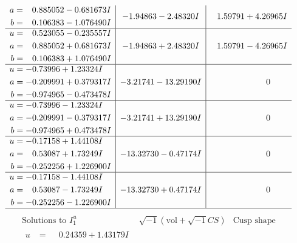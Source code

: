 \documentclass[1p]{elsarticle_modified}
\theoremstyle{definition}
\newcommand{\I}{\sqrt{-1}}
\begin{document}
$$\begin{array}{c|c|c}
\begin{aligned}
a &= \phantom{-}0.885052 - 0.681673 I \\
b &= \phantom{-}0.106383 - 1.076490 I\end{aligned}
 & -1.94863 - 2.48320 I & \phantom{-}1.59791 + 4.26965 I \\ \hline\begin{aligned}
u &= \phantom{-}0.523055 - 0.235557 I \\
a &= \phantom{-}0.885052 + 0.681673 I \\
b &= \phantom{-}0.106383 + 1.076490 I\end{aligned}
 & -1.94863 + 2.48320 I & \phantom{-}1.59791 - 4.26965 I \\ \hline\begin{aligned}
u &= -0.73996 + 1.23324 I \\
a &= -0.209991 + 0.379317 I \\
b &= -0.974965 - 0.473478 I\end{aligned}
 & -3.21741 - 13.29190 I & \phantom{-0.000000 } 0 \\ \hline\begin{aligned}
u &= -0.73996 - 1.23324 I \\
a &= -0.209991 - 0.379317 I \\
b &= -0.974965 + 0.473478 I\end{aligned}
 & -3.21741 + 13.29190 I & \phantom{-0.000000 } 0 \\ \hline\begin{aligned}
u &= -0.17158 + 1.44108 I \\
a &= \phantom{-}0.53087 + 1.73249 I \\
b &= -0.252256 + 1.226900 I\end{aligned}
 & -13.32730 - 0.47174 I & \phantom{-0.000000 } 0 \\ \hline\begin{aligned}
u &= -0.17158 - 1.44108 I \\
a &= \phantom{-}0.53087 - 1.73249 I \\
b &= -0.252256 - 1.226900 I\end{aligned}
 & -13.32730 + 0.47174 I & \phantom{-0.000000 } 0\\
 \hline 
 \end{array}$$\newpage$$\begin{array}{c|c|c}  
\text{Solutions to }I^u_{1}& \I (\text{vol} + \sqrt{-1}CS) & \text{Cusp shape}\\
 \hline 
\begin{aligned}
u &= \phantom{-}0.24359 + 1.43179 I \\

\end{aligned}
\end{array}$$
\end{document}
